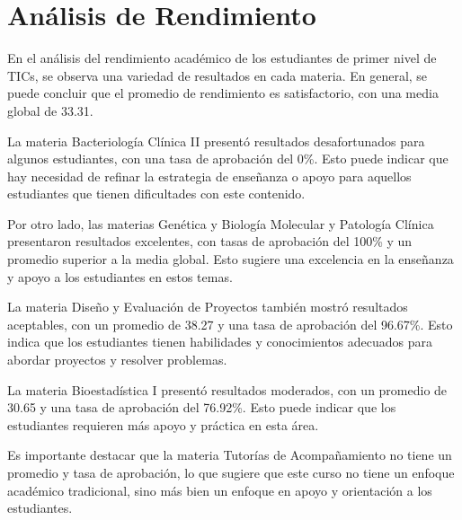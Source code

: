 \vspace{1cm}
\section{Análisis de Rendimiento}
En el análisis del rendimiento académico de los estudiantes de primer nivel de TICs, se observa una variedad de resultados en cada materia. En general, se puede concluir que el promedio de rendimiento es satisfactorio, con una media global de 33.31.

La materia Bacteriología Clínica II presentó resultados desafortunados para algunos estudiantes, con una tasa de aprobación del 0\%. Esto puede indicar que hay necesidad de refinar la estrategia de enseñanza o apoyo para aquellos estudiantes que tienen dificultades con este contenido.

Por otro lado, las materias Genética y Biología Molecular y Patología Clínica presentaron resultados excelentes, con tasas de aprobación del 100\% y un promedio superior a la media global. Esto sugiere una excelencia en la enseñanza y apoyo a los estudiantes en estos temas.

La materia Diseño y Evaluación de Proyectos también mostró resultados aceptables, con un promedio de 38.27 y una tasa de aprobación del 96.67\%. Esto indica que los estudiantes tienen habilidades y conocimientos adecuados para abordar proyectos y resolver problemas.

La materia Bioestadística I presentó resultados moderados, con un promedio de 30.65 y una tasa de aprobación del 76.92\%. Esto puede indicar que los estudiantes requieren más apoyo y práctica en esta área.

Es importante destacar que la materia Tutorías de Acompañamiento no tiene un promedio y tasa de aprobación, lo que sugiere que este curso no tiene un enfoque académico tradicional, sino más bien un enfoque en apoyo y orientación a los estudiantes.

